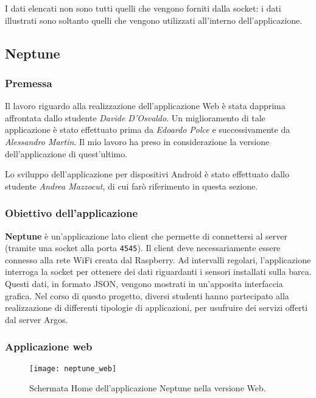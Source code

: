 I dati elencati non sono tutti quelli che vengono forniti dalla socket: i dati illustrati sono soltanto quelli che vengono utilizzati all'interno dell'applicazione.

\subsection{Neptune}
\subsubsection{Premessa}
Il lavoro riguardo alla realizzazione dell'applicazione Web è stata dapprima affrontata dallo studente \textit{Davide D'Osvaldo}. Un miglioramento di tale applicazione è stato effettuato prima da \textit{Edoardo Polce} e successivamente da \textit{Alessandro Martin}. Il mio lavoro ha preso in considerazione la versione dell'applicazione di quest'ultimo.

Lo sviluppo dell'applicazione per dispositivi Android è stato effettuato dallo studente \textit{Andrea Mazzocut}, di cui farò riferimento in questa sezione.

\subsubsection{Obiettivo dell'applicazione}
\textbf{Neptune} è un'applicazione lato client che permette di connettersi al server (tramite una socket alla porta \verb|4545|). Il client deve necessariamente essere connesso alla rete WiFi creata dal Raspberry. Ad intervalli regolari, l'applicazione interroga la socket per ottenere dei dati riguardanti i sensori installati sulla barca. Questi dati, in formato JSON, vengono mostrati in un'apposita interfaccia grafica. Nel corso di questo progetto, diversi studenti hanno partecipato alla realizzazione di differenti tipologie di applicazioni, per usufruire dei servizi offerti dal server Argos.

\subsubsection{Applicazione web}
\begin{figure}
	\begin{center}
		\texttt{[image: neptune\_web]}
		\caption[Neptune - versione Web]{Schermata Home dell'applicazione Neptune nella versione Web.}
		\label{figura:neptune_web}
	\end{center}
\end{figure}

